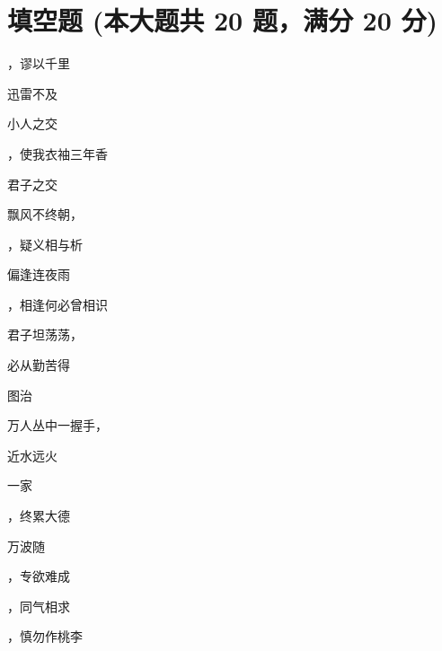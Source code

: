 \documentclass[12pt, a4paper, addpoints]{exam}
\begin{document}
\section{\normalsize{填空题 (本大题共 20 题，满分 20 分)}}
\hspace{1.5cm}
\begin{multicols}{2}
\begin{questions}
\question[1] \uline{\qquad\qquad\qquad}，谬以千里

\question[1] 迅雷不及\uline{\qquad\qquad\qquad}

\question[1] 小人之交\uline{\qquad\qquad\qquad}

\question[1] \uline{\qquad\qquad\qquad}，使我衣袖三年香

\question[1] 君子之交\uline{\qquad\qquad\qquad}

\question[1] 飘风不终朝，\uline{\qquad\qquad\qquad}

\question[1] \uline{\qquad\qquad\qquad}，疑义相与析

\question[1] \uline{\qquad\qquad\qquad}偏逢连夜雨

\question[1] \uline{\qquad\qquad\qquad}，相逢何必曾相识

\question[1] 君子坦荡荡，\uline{\qquad\qquad\qquad}

\question[1] \uline{\qquad\qquad\qquad}必从勤苦得

\question[1] \uline{\qquad\qquad\qquad}图治

\question[1] 万人丛中一握手，\uline{\qquad\qquad\qquad}

\question[1] 近水\uline{\qquad\qquad\qquad}远火

\question[1] \uline{\qquad\qquad\qquad}一家

\question[1] \uline{\qquad\qquad\qquad}，终累大德

\question[1] \uline{\qquad\qquad\qquad}万波随

\question[1] \uline{\qquad\qquad\qquad}，专欲难成

\question[1] \uline{\qquad\qquad\qquad}，同气相求

\question[1] \uline{\qquad\qquad\qquad}，慎勿作桃李

\end{questions}
\end{multicols}
\end{document}
